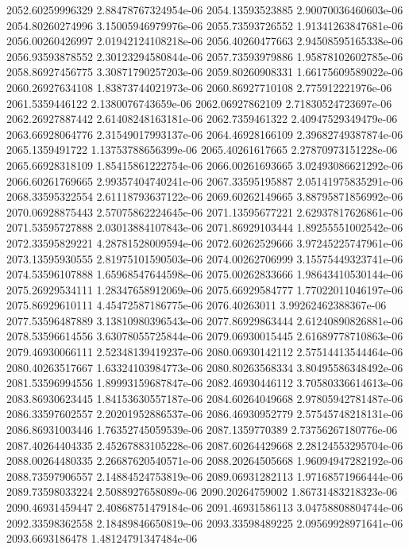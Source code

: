 {2052.60259996329 2.88478767324954e-06
2054.13593523885 2.90070036460603e-06
2054.80260274996 3.15005946979976e-06
2055.73593726552 1.91341263847681e-06
2056.00260426997 2.01942124108218e-06
2056.40260477663 2.94508595165338e-06
2056.93593878552 2.30123294580844e-06
2057.73593979886 1.95878102602785e-06
2058.86927456775 3.30871790257203e-06
2059.80260908331 1.66175609589022e-06
2060.26927634108 1.83873744021973e-06
2060.86927710108 2.775912221976e-06
2061.5359446122 2.1380076743659e-06
2062.06927862109 2.71830524723697e-06
2062.26927887442 2.61408248163181e-06
2062.7359461322 2.40947529349479e-06
2063.66928064776 2.31549017993137e-06
2064.46928166109 2.39682749387874e-06
2065.1359491722 1.13753788656399e-06
2065.40261617665 2.27870973151228e-06
2065.66928318109 1.85415861222754e-06
2066.00261693665 3.02493086621292e-06
2066.60261769665 2.99357404740241e-06
2067.33595195887 2.05141975835291e-06
2068.33595322554 2.61118793637122e-06
2069.60262149665 3.88795871856992e-06
2070.06928875443 2.57075862224645e-06
2071.13595677221 2.62937817626861e-06
2071.53595727888 2.03013884107843e-06
2071.86929103444 1.89255551002542e-06
2072.33595829221 4.28781528009594e-06
2072.60262529666 3.97245225747961e-06
2073.13595930555 2.81975101590503e-06
2074.00262706999 3.15575449323741e-06
2074.53596107888 1.65968547644598e-06
2075.00262833666 1.98643410530144e-06
2075.26929534111 1.28347658912069e-06
2075.66929584777 1.77022011046197e-06
2075.86929610111 4.45472587186775e-06
2076.40263011 3.99262462388367e-06
2077.53596487889 3.13810980396543e-06
2077.86929863444 2.61240890826881e-06
2078.53596614556 3.63078055725844e-06
2079.06930015445 2.61689778710863e-06
2079.46930066111 2.52348139419237e-06
2080.06930142112 2.57514413544464e-06
2080.40263517667 1.63324103984773e-06
2080.80263568334 3.80495586348492e-06
2081.53596994556 1.89993159687847e-06
2082.46930446112 3.70580336614613e-06
2083.86930623445 1.84153630557187e-06
2084.60264049668 2.97805942781487e-06
2086.33597602557 2.20201952886537e-06
2086.46930952779 2.57545748218131e-06
2086.86931003446 1.76352745059539e-06
2087.1359770389 2.73756267180776e-06
2087.40264404335 2.45267883105228e-06
2087.60264429668 2.28124553295704e-06
2088.00264480335 2.26687620540571e-06
2088.20264505668 1.96094947282192e-06
2088.73597906557 2.14884524753819e-06
2089.06931282113 1.97168571966444e-06
2089.73598033224 2.5088927658089e-06
2090.20264759002 1.86731483218323e-06
2090.46931459447 2.40868751479184e-06
2091.46931586113 3.04758808804744e-06
2092.33598362558 2.18489846650819e-06
2093.33598489225 2.09569928971641e-06
2093.6693186478 1.48124791347484e-06
}
